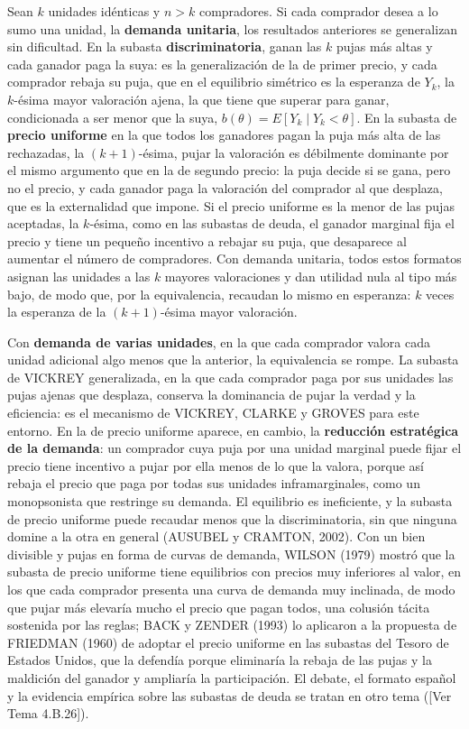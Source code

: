 \documentclass[10pt,a4paper]{article}
\newcommand{\authorfont}[1]{{\fontfamily{EBGaramond-TLF}\selectfont #1}}
\begin{document}
Sean $k$ unidades idénticas y $n>k$ compradores. Si cada comprador desea a lo sumo una unidad, la \textbf{demanda unitaria}, los resultados anteriores se generalizan sin dificultad. En la subasta \textbf{discriminatoria}, ganan las $k$ pujas más altas y cada ganador paga la suya: es la generalización de la de primer precio, y cada comprador rebaja su puja, que en el equilibrio simétrico es la esperanza de $Y_k$, la $k$-ésima mayor valoración ajena, la que tiene que superar para ganar, condicionada a ser menor que la suya, $b(\theta)=E\left[Y_k\mid Y_k<\theta\right]$. En la subasta de \textbf{precio uniforme} en la que todos los ganadores pagan la puja más alta de las rechazadas, la $(k+1)$-ésima, pujar la valoración es débilmente dominante por el mismo argumento que en la de segundo precio: la puja decide si se gana, pero no el precio, y cada ganador paga la valoración del comprador al que desplaza, que es la externalidad que impone. Si el precio uniforme es la menor de las pujas aceptadas, la $k$-ésima, como en las subastas de deuda, el ganador marginal fija el precio y tiene un pequeño incentivo a rebajar su puja, que desaparece al aumentar el número de compradores. Con demanda unitaria, todos estos formatos asignan las unidades a las $k$ mayores valoraciones y dan utilidad nula al tipo más bajo, de modo que, por la equivalencia, recaudan lo mismo en esperanza: $k$ veces la esperanza de la $(k+1)$-ésima mayor valoración.

Con \textbf{demanda de varias unidades}, en la que cada comprador valora cada unidad adicional algo menos que la anterior, la equivalencia se rompe. La subasta de VICKREY generalizada, en la que cada comprador paga por sus unidades las pujas ajenas que desplaza, conserva la dominancia de pujar la verdad y la eficiencia: es el mecanismo de VICKREY, CLARKE y GROVES para este entorno. En la de precio uniforme aparece, en cambio, la \textbf{reducción estratégica de la demanda}: un comprador cuya puja por una unidad marginal puede fijar el precio tiene incentivo a pujar por ella menos de lo que la valora, porque así rebaja el precio que paga por todas sus unidades inframarginales, como un monopsonista que restringe su demanda. El equilibrio es ineficiente, y la subasta de precio uniforme puede recaudar menos que la discriminatoria, sin que ninguna domine a la otra en general (AUSUBEL y CRAMTON, 2002). Con un bien divisible y pujas en forma de curvas de demanda, WILSON (1979) mostró que la subasta de precio uniforme tiene equilibrios con precios muy inferiores al valor, en los que cada comprador presenta una curva de demanda muy inclinada, de modo que pujar más elevaría mucho el precio que pagan todos, una colusión tácita sostenida por las reglas; BACK y ZENDER (1993) lo aplicaron a la propuesta de FRIEDMAN (1960) de adoptar el precio uniforme en las subastas del Tesoro de Estados Unidos, que la defendía porque eliminaría la rebaja de las pujas y la maldición del ganador y ampliaría la participación. El debate, el formato español y la evidencia empírica sobre las subastas de deuda se tratan en otro tema ([\authorfont{Ver Tema 4.B.26}]).
\end{document}
